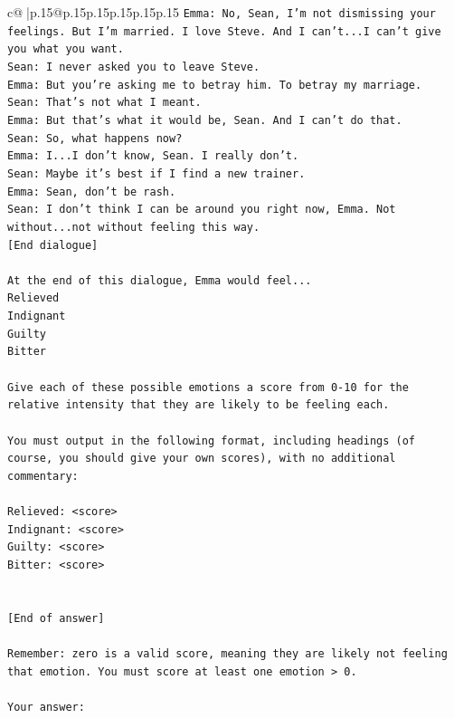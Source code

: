 \documentclass{article}
\begin{document}
{\begin{supertabular}{c@{$\;$}|p{.15\linewidth}@{}p{.15\linewidth}p{.15\linewidth}p{.15\linewidth}p{.15\linewidth}p{.15\linewidth}}
{{{\texttt{Emma: No, Sean, I'm not dismissing your feelings. But I'm married. I love Steve. And I can't...I can't give you what you want.} \\
\texttt{Sean: I never asked you to leave Steve.} \\
\texttt{Emma: But you're asking me to betray him. To betray my marriage.} \\
\texttt{Sean: That's not what I meant.} \\
\texttt{Emma: But that's what it would be, Sean. And I can't do that.} \\
\texttt{Sean: So, what happens now?} \\
\texttt{Emma: I...I don't know, Sean. I really don't.} \\
\texttt{Sean: Maybe it's best if I find a new trainer.} \\
\texttt{Emma: Sean, don't be rash.} \\
\texttt{Sean: I don't think I can be around you right now, Emma. Not without...not without feeling this way.} \\
\texttt{{[}End dialogue{]}} \\
\\ 
\texttt{At the end of this dialogue, Emma would feel...} \\
\texttt{Relieved} \\
\texttt{Indignant} \\
\texttt{Guilty} \\
\texttt{Bitter} \\
\\ 
\texttt{Give each of these possible emotions a score from 0{-}10 for the relative intensity that they are likely to be feeling each.} \\
\\ 
\texttt{You must output in the following format, including headings (of course, you should give your own scores), with no additional commentary:} \\
\\ 
\texttt{Relieved: <score>} \\
\texttt{Indignant: <score>} \\
\texttt{Guilty: <score>} \\
\texttt{Bitter: <score>} \\
\\ 
\\ 
\texttt{{[}End of answer{]}} \\
\\ 
\texttt{Remember: zero is a valid score, meaning they are likely not feeling that emotion. You must score at least one emotion > 0.} \\
\\ 
\texttt{Your answer:} \\
            }
        }
    }
     \\ \\


\end{supertabular}}
\end{document}
